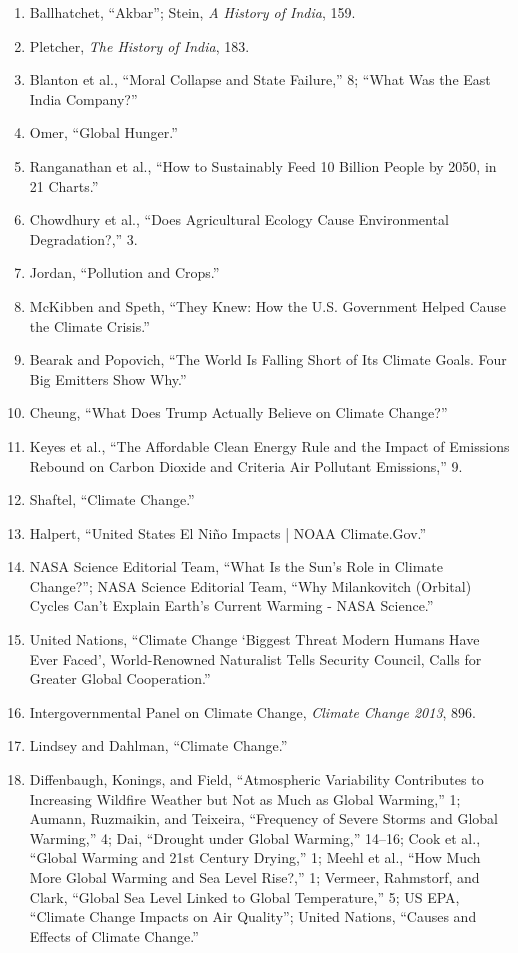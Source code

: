 \documentclass[12pt]{article}
\begin{document}
\begin{enumerate}[leftmargin=*]
\item Ballhatchet, ``Akbar''; Stein, \textit{A History of India}, 159.
\item Pletcher, \textit{The History of India}, 183.
\item Blanton et al., ``Moral Collapse and State Failure,'' 8; ``What Was the East India Company?''
\item Omer, ``Global Hunger.''
\item Ranganathan et al., ``How to Sustainably Feed 10 Billion People by 2050, in 21 Charts.''
\item Chowdhury et al., ``Does Agricultural Ecology Cause Environmental Degradation?,'' 3.
\item Jordan, ``Pollution and Crops.''
\item McKibben and Speth, ``They Knew: How the U.S. Government Helped Cause the Climate Crisis.''
\item Bearak and Popovich, ``The World Is Falling Short of Its Climate Goals. Four Big Emitters Show Why.''
\item Cheung, ``What Does Trump Actually Believe on Climate Change?''
\item Keyes et al., ``The Affordable Clean Energy Rule and the Impact of Emissions Rebound on Carbon Dioxide and Criteria Air Pollutant Emissions,'' 9.
\item Shaftel, ``Climate Change.''
\item Halpert, ``United States El Ni\~no Impacts | NOAA Climate.Gov.''
\item NASA Science Editorial Team, ``What Is the Sun’s Role in Climate Change?''; NASA Science Editorial Team, ``Why Milankovitch (Orbital) Cycles Can’t Explain Earth’s Current Warming - NASA Science.''
\item United Nations, ``Climate Change `Biggest Threat Modern Humans Have Ever Faced', World-Renowned Naturalist Tells Security Council, Calls for Greater Global Cooperation.''
\item Intergovernmental Panel on Climate Change, \textit{Climate Change 2013}, 896.
\item Lindsey and Dahlman, ``Climate Change.''
\item Diffenbaugh, Konings, and Field, ``Atmospheric Variability Contributes to Increasing Wildfire Weather but Not as Much as Global Warming,'' 1; Aumann, Ruzmaikin, and Teixeira, ``Frequency of Severe Storms and Global Warming,'' 4; Dai, ``Drought under Global Warming,'' 14--16; Cook et al., ``Global Warming and 21st Century Drying,'' 1; Meehl et al., ``How Much More Global Warming and Sea Level Rise?,'' 1; Vermeer, Rahmstorf, and Clark, ``Global Sea Level Linked to Global Temperature,'' 5; US EPA, ``Climate Change Impacts on Air Quality''; United Nations, ``Causes and Effects of Climate Change.''

\end{enumerate}
\end{document}
